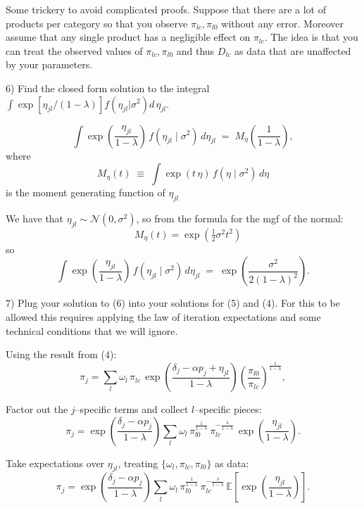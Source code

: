 \documentclass{article}
\begin{document}
\begin{tcolorbox}
Some trickery to avoid complicated proofs. Suppose that there are a lot of products per category so that you observe $\pi_{lc}, \pi_{l0}$ without any error. Moreover assume that any single product has a negligible effect on $\pi_{lc}$. The idea is that you can treat the observed values of $\pi_{lc}, \pi_{l0}$ and thus $D_{lc}$ as data that are unaffected by your parameters.
\end{tcolorbox}

\begin{tcolorbox}
6) Find the closed form solution to the integral $\int \exp[\eta_{jl}/(1-\lambda)] f(\eta_{jl} | \sigma^2) d\, \eta_{jl}$.
\end{tcolorbox}

\[
\int \exp\!\left(\frac{\eta_{jl}}{1-\lambda}\right)\, f(\eta_{jl}\mid \sigma^2)\, d\eta_{jl}
\;=\;
M_{\eta}\!\left(\frac{1}{1-\lambda}\right),
\]
where
\[
M_{\eta}(t) \;\equiv\; \int \exp(t\,\eta)\, f(\eta\mid \sigma^2)\, d\eta
\]
is the moment generating function of \(\eta_{jl}\)

\vspace{5mm}

We have that $\eta_{jl}\sim \mathcal{N}(0,\sigma^2)$, so from the formula for the mgf of the normal:
\[
\quad M_{\eta}(t)=\exp\!\left(\tfrac{1}{2}\sigma^2 t^2\right)
\]
so
\[
\int \exp\!\left(\frac{\eta_{jl}}{1-\lambda}\right)\, f(\eta_{jl}\mid \sigma^2)\, d\eta_{jl}
\;=\;
\exp\!\left(\frac{\sigma^{2}}{2(1-\lambda)^{2}}\right).
\]


\begin{tcolorbox}
7) Plug your solution to (6) into your solutions for (5) and (4). For this to be allowed this requires applying the law of iteration expectations and some technical conditions that we will ignore.
\end{tcolorbox}

Using the result from (4):
\[
\pi_j
=\sum_{l}\omega_l\,\pi_{lc}\,
\exp\!\left(\frac{\delta_j-\alpha p_j+\eta_{jl}}{1-\lambda}\right)
\left(\frac{\pi_{l0}}{\pi_{lc}}\right)^{\!\frac{1}{1-\lambda}},
\]

Factor out the $j$–specific terms and collect $l$–specific pieces:
\[
\pi_j
=\exp\!\left(\frac{\delta_j-\alpha p_j}{1-\lambda}\right)
\sum_{l}\omega_l\,
\pi_{l0}^{\frac{1}{1-\lambda}}\,
\pi_{lc}^{-\frac{\lambda}{1-\lambda}}\,
\exp\!\left(\frac{\eta_{jl}}{1-\lambda}\right).
\]

Take expectations over $\eta_{jl}$, treating
$\{\omega_l,\pi_{lc},\pi_{l0}\}$ as data:
\[
\pi_j
=\exp\!\left(\frac{\delta_j-\alpha p_j}{1-\lambda}\right)
\sum_{l}\omega_l\,
\pi_{l0}^{\frac{1}{1-\lambda}}\,
\pi_{lc}^{-\frac{\lambda}{1-\lambda}}\,
\mathbb{E}\!\left[\exp\!\left(\frac{\eta_{jl}}{1-\lambda}\right)\right].
\]
\end{document}
